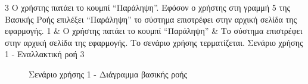 \useCaseAlternateFlowTable
{3}
{Ο χρήστης πατάει το κουμπί ``Παράληψη''.}
{Εφόσον ο χρήστης στη γραμμή 5 της Βασικής Ροής επιλέξει ``Παράληψη'' το σύστημα επιστρέφει στην αρχική σελίδα της εφαρμογής.}
{
    1 & Ο χρήστης πατάει το κουμπί ``Παράληψη'' & Το σύστημα επιστρέφει στην αρχική σελίδα της εφαρμογής.
}
{Το σενάριο χρήσης τερματίζεται.}
{Σενάριο χρήσης 1 - Εναλλακτική ροή 3}
{\label{table:3-4-use-case-sign-up-alternate-flow-3}}

\begin{figure}[H]
    \centering
    
    \caption{Σενάριο χρήσης 1 - Διάγραμμα βασικής ροής}
    \label{figure:3-4-use-case-sign-up-base-flow-sequence-diagram}
\end{figure}
